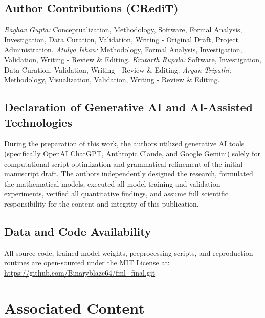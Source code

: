 \documentclass[11pt]{article}
\begin{document}
\subsection*{Author Contributions (CRediT)}
\textit{Raghav Gupta:} Conceptualization, Methodology, Software, Formal Analysis, Investigation, Data Curation, Validation, Writing - Original Draft, Project Administration. \textit{Atulya Ishan:} Methodology, Formal Analysis, Investigation, Validation, Writing - Review \& Editing. \textit{Krutarth Rupala:} Software, Investigation, Data Curation, Validation, Writing - Review \& Editing. \textit{Aryan Tripathi:} Methodology, Visualization, Validation, Writing - Review \& Editing.

\subsection*{Declaration of Generative AI and AI-Assisted Technologies}
During the preparation of this work, the authors utilized generative AI tools (specifically OpenAI ChatGPT, Anthropic Claude, and Google Gemini) solely for computational script optimization and grammatical refinement of the initial manuscript draft. The authors independently designed the research, formulated the mathematical models, executed all model training and validation experiments, verified all quantitative findings, and assume full scientific responsibility for the content and integrity of this publication.

\subsection*{Data and Code Availability}
All source code, trained model weights, preprocessing scripts, and reproduction routines are open-sourced under the MIT License at: \url{https://github.com/Binaryblaze64/fml_final.git}

\section*{Associated Content}
\end{document}
